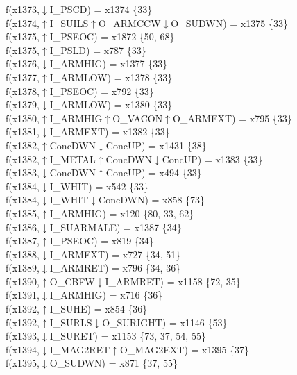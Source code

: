 f(x1373,$\downarrow$I\_PSCD) = x1374 \{33\} \\  
f(x1374,$\uparrow$I\_SUILS$\uparrow$O\_ARMCCW$\downarrow$O\_SUDWN) = x1375 \{33\} \\  
f(x1375,$\uparrow$I\_PSEOC) = x1872 \{50, 68\} \\  
f(x1375,$\uparrow$I\_PSLD) = x787 \{33\} \\  
f(x1376,$\downarrow$I\_ARMHIG) = x1377 \{33\} \\  
f(x1377,$\uparrow$I\_ARMLOW) = x1378 \{33\} \\  
f(x1378,$\uparrow$I\_PSEOC) = x792 \{33\} \\  
f(x1379,$\downarrow$I\_ARMLOW) = x1380 \{33\} \\  
f(x1380,$\uparrow$I\_ARMHIG$\uparrow$O\_VACON$\uparrow$O\_ARMEXT) = x795 \{33\} \\  
f(x1381,$\downarrow$I\_ARMEXT) = x1382 \{33\} \\  
f(x1382,$\uparrow$ConcDWN$\downarrow$ConcUP) = x1431 \{38\} \\  
f(x1382,$\uparrow$I\_METAL$\uparrow$ConcDWN$\downarrow$ConcUP) = x1383 \{33\} \\  
f(x1383,$\downarrow$ConcDWN$\uparrow$ConcUP) = x494 \{33\} \\  
f(x1384,$\downarrow$I\_WHIT) = x542 \{33\} \\  
f(x1384,$\downarrow$I\_WHIT$\downarrow$ConcDWN) = x858 \{73\} \\  
f(x1385,$\uparrow$I\_ARMHIG) = x120 \{80, 33, 62\} \\  
f(x1386,$\downarrow$I\_SUARMALE) = x1387 \{34\} \\  
f(x1387,$\uparrow$I\_PSEOC) = x819 \{34\} \\  
f(x1388,$\downarrow$I\_ARMEXT) = x727 \{34, 51\} \\  
f(x1389,$\downarrow$I\_ARMRET) = x796 \{34, 36\} \\  
f(x1390,$\uparrow$O\_CBFW$\downarrow$I\_ARMRET) = x1158 \{72, 35\} \\  
f(x1391,$\downarrow$I\_ARMHIG) = x716 \{36\} \\  
f(x1392,$\uparrow$I\_SUHE) = x854 \{36\} \\  
f(x1392,$\uparrow$I\_SURLS$\downarrow$O\_SURIGHT) = x1146 \{53\} \\  
f(x1393,$\downarrow$I\_SURET) = x1153 \{73, 37, 54, 55\} \\  
f(x1394,$\downarrow$I\_MAG2RET$\uparrow$O\_MAG2EXT) = x1395 \{37\} \\  
f(x1395,$\downarrow$O\_SUDWN) = x871 \{37, 55\} \\  
